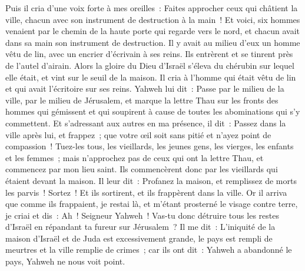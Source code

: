\begin{multicols}{2}
\VerseOne{}Puis il cria d'une voix forte à mes oreilles~: Faites approcher ceux qui châtient la ville, chacun avec son instrument de destruction à la main~!
Et voici, six hommes venaient par le chemin de la haute porte qui regarde vers le nord, et chacun avait dans sa main son instrument de destruction. Il y avait au milieu d'eux un homme vêtu de lin, avec un encrier d'écrivain à ses reins. Ils entrèrent et se tinrent près de l'autel d'airain.
Alors la gloire du Dieu d'Israël s'éleva du chérubin sur lequel elle était, et vint sur le seuil de la maison. Il cria à l'homme qui était vêtu de lin et qui avait l'écritoire sur ses reins.
Yahweh lui dit~: Passe par le milieu de la ville, par le milieu de Jérusalem, et marque la lettre Thau sur les fronts des hommes qui gémissent et qui soupirent à cause de toutes les abominations qui s'y commettent.
Et s'adressant aux autres en ma présence, il dit~: Passez dans la ville après lui, et frappez~; que votre œil soit sans pitié et n'ayez point de compassion~!
Tuez-les tous, les vieillards, les jeunes gens, les vierges, les enfants et les femmes~; mais n'approchez pas de ceux qui ont la lettre Thau, et commencez par mon lieu saint. Ils commencèrent donc par les vieillards qui étaient devant la maison.
Il leur dit~: Profanez la maison, et remplissez de morts les parvis~! Sortez~! Et ils sortirent, et ils frappèrent dans la ville.
Or il arriva que comme ils frappaient, je restai là, et m'étant prosterné le visage contre terre, je criai et dis~: Ah~! Seigneur Yahweh~! Vas-tu donc détruire tous les restes d'Israël en répandant ta fureur sur Jérusalem~?
Il me dit~: L'iniquité de la maison d'Israël et de Juda est excessivement grande, le pays est rempli de meurtres et la ville remplie de crimes~; car ils ont dit~: Yahweh a abandonné le pays, Yahweh ne nous voit point.

\end{multicols}
